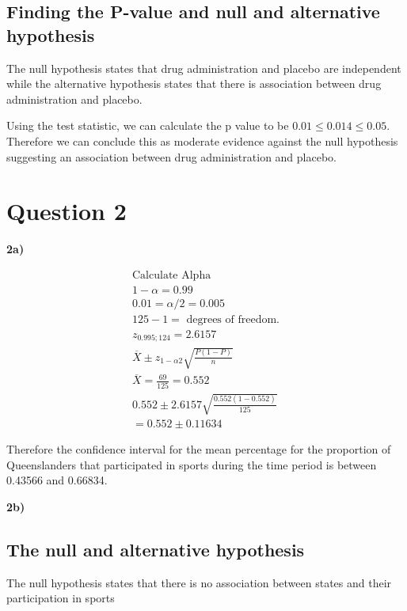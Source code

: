 \documentclass[oneside, a4paper]{article}
\begin{document}
\subsection{Finding the P-value and null and alternative hypothesis}
The null hypothesis states that drug administration and placebo are independent while the alternative hypothesis states that there is association between drug administration and placebo.

Using the test statistic, we can calculate the p value to be $0.01 \leq 0.014 \leq 0.05$. Therefore we can conclude this as moderate evidence against the null hypothesis suggesting an association between drug administration and placebo.


\newpage

\section{Question 2}
\textbf{2a)}

\begin{equation*}
    \begin{split}
        \text{Calculate Alpha} \\
        1 - \alpha = 0.99 \\
        0.01 = \alpha / 2 = 0.005 \\
        125 - 1 = \text{ degrees of freedom.} \\
        z_{0.995;124} =  2.6157 \\
        \overline{X} \pm z_{1-\alpha2}\sqrt{\frac{P(1-P)}{n}}  \\
        \overline{X} = \frac{69}{125} = 0.552 \\
        0.552 \pm 2.6157 \sqrt{\frac{0.552(1-0.552)}{125}} \\
        = 0.552 \pm 0.11634
    \end{split}
\end{equation*}

Therefore the confidence interval for the mean percentage for the proportion of Queenslanders that participated in sports during the time period is between 0.43566 and 0.66834.

\textbf{2b)}

\subsection{The null and alternative hypothesis}

The null hypothesis states that there is no association between states and their participation in sports
\end{document}
